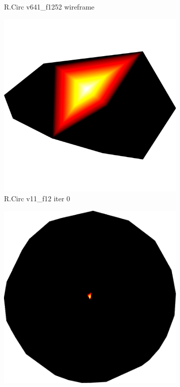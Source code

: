 \begin{figure}[ht]
{\begin{subfigure}[b]{0.48\linewidth}
		\caption{R.Circ v641\_f1252 wireframe}\label{fig:rcirc.b}
	\end{subfigure}

	\bigskip
	\begin{subfigure}[b]{0.48\linewidth}
		\includegraphics[width=1.0\linewidth,height=0.3\textheight,keepaspectratio]{data/synthetic_meshes/random_circle_tessellation_Dirac_delta_1_v11_f12_funcvals_0iter.png}
		\caption{R.Circ v11\_f12 iter 0}\label{fig:rcirc.c}
	\end{subfigure}
	\begin{subfigure}[b]{0.48\linewidth}
		\includegraphics[width=1.0\linewidth,height=0.3\textheight,keepaspectratio]{data/synthetic_meshes/random_circle_tessellation_Dirac_delta_10_v641_f1252_funcvals_0iter.png}

\end{subfigure}}
\end{figure}
